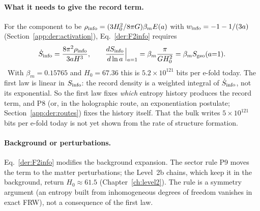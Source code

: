 \paragraph{What it needs to give the record term.} For the component to be $\rho_{\rm info}=(3H_0^2/8\pi G)\beta_mE(a)$ with $w_{\rm info}=-1-1/(3a)$
(Section~\ref{app:der:activation}), Eq.~\eqref{der:F2info} requires
\begin{equation}
\dot S_{\rm info}=\frac{8\pi^2\rho_{\rm info}}{3aH^3},\qquad \frac{dS_{\rm info}}{d\ln a}\Big|_{a=1}=\beta_m\frac{\pi}{GH_0^2}=\beta_mS_{\rm geo}(a{=}1). \label{der:Sneed}
\end{equation}
\calc\ With $\beta_m=0.15765$ and $H_0=67.36$ this is $5.2\times10^{121}$ bits per e-fold today. The first law is linear in $S_{\rm info}$:
the record density is a weighted integral of $\dot S_{\rm info}$, not its exponential. So the first law fixes \emph{which} entropy history produces the
record term, and P8 (or, in the holographic route, an exponentiation postulate; Section~\ref{app:der:routes}) fixes the history itself. That
the bulk writes $5\times10^{121}$ bits per e-fold today is not yet shown from the rate of structure formation. \openprob

\paragraph{Background or perturbations.} Eq.~\eqref{der:F2info} modifies the background expansion. The sector rule P9 moves the term to the matter
perturbations; the Level~2b chains, which keep it in the background, return $H_0\approx61.5$ (Chapter~\ref{ch:level2}). The rule is a symmetry argument
(an entropy built from inhomogeneous degrees of freedom vanishes in exact FRW), not a consequence of the first law. \conjecture

